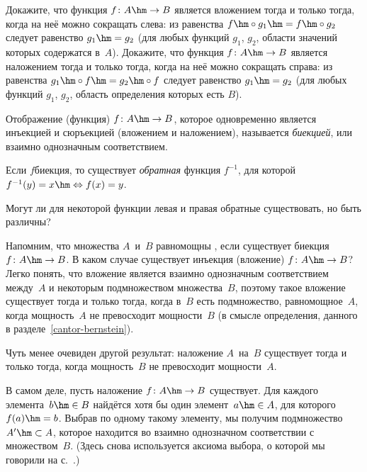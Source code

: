\begin{problem}
Докажите, что функция $f\colon A\hm\to B$ является вложением тогда и
только тогда, когда на неё можно сокращать слева: из равенства
$f\hm\circ g_1 \hm= f\hm\circ g_2$ следует равенство $g_1 \hm= g_2$ (для
любых функций $g_1$, $g_2$, области значений которых содержатся в~$A$).
Докажите, что функция $f\colon A\hm\to B$ является наложением тогда и
только тогда, когда на неё можно сокращать справа: из равенства
$g_1 \hm\circ f \hm= g_2 \hm\circ f$ следует равенство $g_1 \hm= g_2$ (для
любых функций $g_1$, $g_2$, область определения которых есть $B$).
\end{problem}

\problskip
        \label{bijection}%
Отображение (функция) $f\colon A\hm\to B$, которое одновременно
является инъекцией и сюръекцией (вложением и наложением),
называется \emph{биекцией}, или взаимно однозначным
соответствием.

Если $f$\т биекция, то существует \emph{обратная}%
 функция
$f^{-1}$, для которой ${f^{-1}(y)=x}\hm\Leftrightarrow{f(x)=y}$.

\begin{problem}
Могут ли для некоторой функции левая и правая обратные
существовать, но быть различны?
\end{problem}

Напомним, что множества $A$~и~$B$ равномощны%
, если существует
биекция $f\colon A\hm\to B$. В каком случае существует инъекция
(вложение) $f\colon A\hm\to B$? Легко понять, что вложение является
взаимно однозначным соответствием между~$A$ и некоторым
подмножеством множества~$B$, поэтому такое
вложение существует тогда и
только тогда, когда в~$B$ есть подмножество,
равномощное~$A$,  когда мощность~$A$ не превосходит
мощности~$B$ (в смысле определения, данного в
разделе~\ref{cantor-bernstein}).

Чуть менее очевиден другой результат: наложение $A$~на~$B$
существует тогда и только тогда, когда мощность~$B$ не
превосходит мощности~$A$.

В самом деле, пусть наложение $f\colon A\hm\to B$ существует. Для
каждого элемента~$b\hm\in B$ найдётся хотя бы один элемент~$a\hm\in A$,
для которого~$f(a)\hm=b$. Выбрав по одному такому элементу, мы
получим подмножество~$A'\hm\subset A$, которое находится во
взаимно однозначном соответствии с множеством~$B$. (Здесь
снова используется аксиома выбора,
о которой мы говорили на
с.~\pageref{axiom-of-choice}.)

